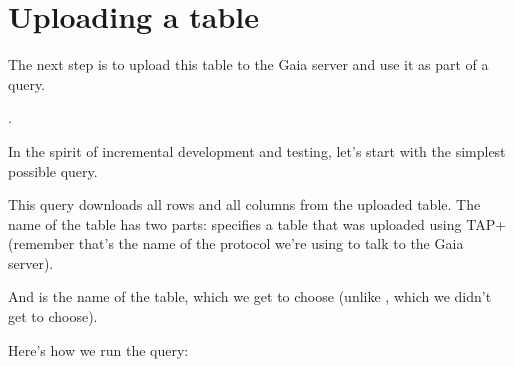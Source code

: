 \documentclass[letterpaper,10pt,english]{sphinxmanual}
\begin{document}
\section{Uploading a table}
\label{\detokenize{05_join:uploading-a-table}}
The next step is to upload this table to the Gaia server and use it as part of a query.

.

In the spirit of incremental development and testing, let’s start with the simplest possible query.

\begin{sphinxVerbatim}[commandchars=\\\{\}]
  
\end{sphinxVerbatim}

This query downloads all rows and all columns from the uploaded table.  The name of the table has two parts:  specifies a table that was uploaded using TAP+ (remember that’s the name of the protocol we’re using to talk to the Gaia server).

And  is the name of the table, which we get to choose (unlike , which we didn’t get to choose).

Here’s how we run the query:

\begin{sphinxVerbatim}[commandchars=\\\{\}]
   

   
\end{sphinxVerbatim}
\end{document}
